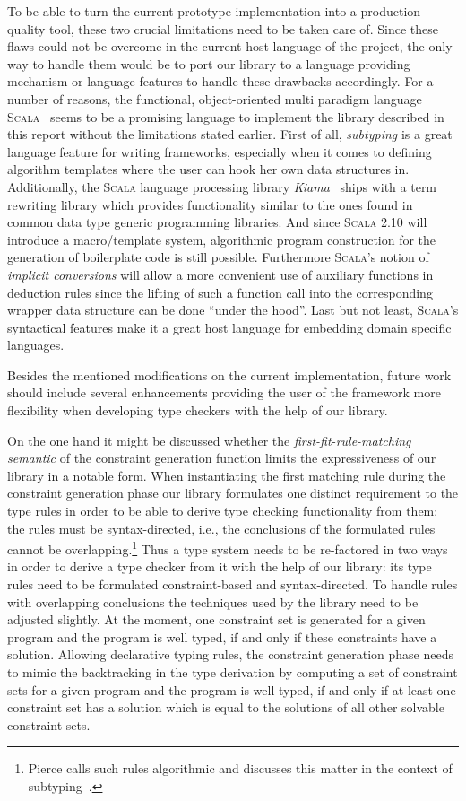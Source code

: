 To be able to turn the current prototype implementation into a
production quality tool, these two crucial limitations need to be
taken care of. Since these flaws could not be overcome in the current
host language of the project, the only way to handle them would be to
port our library to a language providing mechanism or language
features to handle these drawbacks accordingly. For a number of
reasons, the functional, object-oriented multi paradigm language
\textsc{Scala}~\cite{Odersky2008} seems to be a promising language to
implement the library described in this report without the limitations
stated earlier. First of all, \textit{subtyping} is a great language
feature for writing frameworks, especially when it comes to defining
algorithm templates where the user can hook her own data structures
in. Additionally, the \textsc{Scala} language processing library
\textit{Kiama}~\cite{Kiama} ships with a term rewriting library which
provides functionality similar to the ones found in common data type
generic programming libraries. And since \textsc{Scala} 2.10 will
introduce a macro/template system, algorithmic program construction
for the generation of boilerplate code is still possible. Furthermore
\textsc{Scala}'s notion of \textit{implicit conversions} will allow a
more convenient use of auxiliary functions in deduction rules since
the lifting of such a function call into the corresponding wrapper
data structure can be done ``under the hood''. Last but not least,
\textsc{Scala}'s syntactical features make it a great host language
for embedding domain specific languages.

Besides the mentioned modifications on the current implementation,
future work should include several enhancements providing the user of
the framework more flexibility when developing type checkers with the
help of our library.

On the one hand it might be discussed whether the
\textit{first-fit-rule-matching semantic} of the constraint generation
function limits the expressiveness of our library in a notable
form. When instantiating the first matching rule during the constraint
generation phase our library formulates one distinct requirement to
the type rules in order to be able to derive type checking
functionality from them: the rules must be syntax-directed, i.e., the
conclusions of the formulated rules cannot be
overlapping.\footnote{Pierce calls such rules algorithmic and
  discusses this matter in the context of subtyping~\cite{Tapl}.} Thus
a type system needs to be re-factored in two ways in order to derive a
type checker from it with the help of our library: its type rules
need to be formulated constraint-based and syntax-directed. To handle
rules with overlapping conclusions the techniques used by the library
need to be adjusted slightly. At the moment, one constraint set is
generated for a given program and the program is well typed, if and
only if these constraints have a solution. Allowing declarative typing
rules, the constraint generation phase needs to mimic the backtracking
in the type derivation by computing a set of constraint sets for a
given program and the program is well typed, if and only if at least
one constraint set has a solution which is equal to the solutions of
all other solvable constraint sets.


